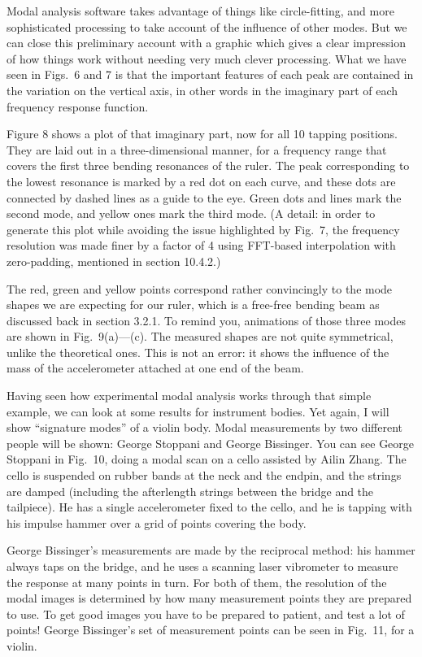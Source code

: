   Modal analysis software takes advantage of things like circle-fitting, and 
  more sophisticated processing to take account of the influence of other 
  modes. But we can close this preliminary account with a graphic which gives a 
  clear impression of how things work without needing very much clever 
  processing. What we have seen in Figs.\ 6 and 7 is that the important 
  features of each peak are contained in the variation on the vertical axis, in 
  other words in the imaginary part of each frequency response function. 

  Figure 8 shows a plot of that imaginary part, now for all 10 tapping 
  positions. They are laid out in a three-dimensional manner, for a frequency 
  range that covers the first three bending resonances of the ruler. The peak 
  corresponding to the lowest resonance is marked by a red dot on each curve, 
  and these dots are connected by dashed lines as a guide to the eye. Green 
  dots and lines mark the second mode, and yellow ones mark the third mode. (A 
  detail: in order to generate this plot while avoiding the issue highlighted 
  by Fig.\ 7, the frequency resolution was made finer by a factor of 4 using 
  FFT-based interpolation with zero-padding, mentioned in section 10.4.2.) 

  The red, green and yellow points correspond rather convincingly to the mode 
  shapes we are expecting for our ruler, which is a free-free bending beam as 
  discussed back in section 3.2.1. To remind you, animations of those three 
  modes are shown in Fig.\ 9(a)—(c). The measured shapes are not quite 
  symmetrical, unlike the theoretical ones. This is not an error: it shows the 
  influence of the mass of the accelerometer attached at one end of the beam. 

  Having seen how experimental modal analysis works through that simple 
  example, we can look at some results for instrument bodies. Yet again, I will 
  show “signature modes” of a violin body. Modal measurements by two different 
  people will be shown: George Stoppani and George Bissinger. You can see 
  George Stoppani in Fig.\ 10, doing a modal scan on a cello assisted by Ailin 
  Zhang. The cello is suspended on rubber bands at the neck and the endpin, and 
  the strings are damped (including the afterlength strings between the bridge 
  and the tailpiece). He has a single accelerometer fixed to the cello, and he 
  is tapping with his impulse hammer over a grid of points covering the body. 

  George Bissinger’s measurements are made by the reciprocal method: his hammer 
  always taps on the bridge, and he uses a scanning laser vibrometer to measure 
  the response at many points in turn. For both of them, the resolution of the 
  modal images is determined by how many measurement points they are prepared 
  to use. To get good images you have to be prepared to patient, and test a lot 
  of points! George Bissinger’s set of measurement points can be seen in Fig.\ 
  11, for a violin. 

